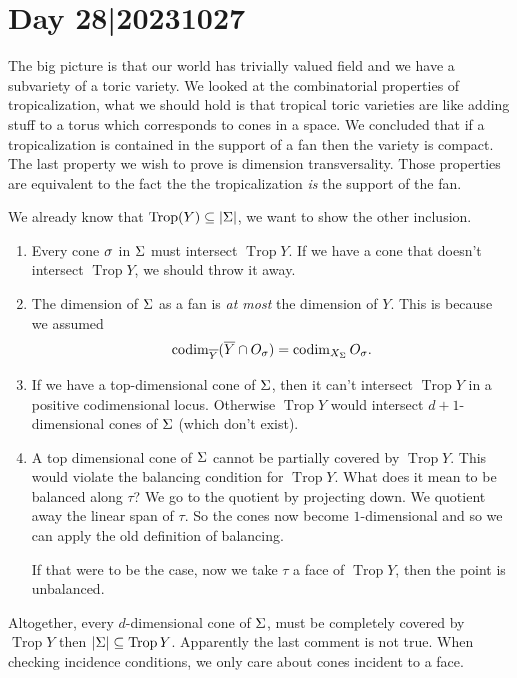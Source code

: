 \documentclass[12pt]{memoir}
\DeclareMathOperator{\Trop}{Trop}
\theoremstyle{definition}
\begin{document}
\section{Day 28|20231027}

The big picture is that our world has trivially valued field and we have a subvariety of a toric variety. We looked at the combinatorial properties of tropicalization, what we should hold is that tropical toric varieties are like adding stuff to a torus which corresponds to cones in a space. We concluded that if a tropicalization is contained in the support of a fan then the variety is compact. The last property we wish to prove is dimension transversality. Those properties are equivalent to the fact the the tropicalization \emph{is} the support of the fan.

\begin{ptcbp}
We already know that $\Trop(Y)\subseteq |\Sg|$, we want to show the other inclusion. 
\begin{enumerate}
    \item Every cone $\sigma$ in $\Sigma$ must intersect $\Trop Y$. If we have a cone that doesn't intersect $\Trop Y$, we should throw it away.
    \item The dimension of $\Sigma$ as a fan is \emph{at most} the dimension of $Y$. This is because we assumed 
    $$\operatorname{codim}_{\overline Y}(\overline Y\cap O_\sigma)=\operatorname{codim}_{X_\Sigma} O_\sigma.$$
    \item If we have a top-dimensional cone of $\Sigma$, then it can't intersect $\Trop Y$ in a positive codimensional locus. Otherwise $\Trop Y$ would intersect $d+1$-dimensional cones of $\Sigma$ (which don't exist).
    \item A top dimensional cone of $\Sigma$ cannot be partially covered by $\Trop Y$. This would violate the balancing condition for $\Trop Y$. What does it mean to be balanced along $\tau$? We go to the quotient by projecting down. We quotient away the linear span of $\tau$. So the cones now become $1$-dimensional and so we can apply the old definition of balancing.\par 
    If that were to be the case, now we take $\tau$ a face of $\Trop Y$, then the point is unbalanced. 
\end{enumerate}
Altogether, every $d$-dimensional cone of $\Sigma$, must be completely covered by $\Trop Y$ then $|\Sg|\subseteq\Trop Y$.  Apparently the last comment is not true. When checking incidence conditions, we only care about cones incident to a face.\par 

\end{ptcbp}
\end{document}
